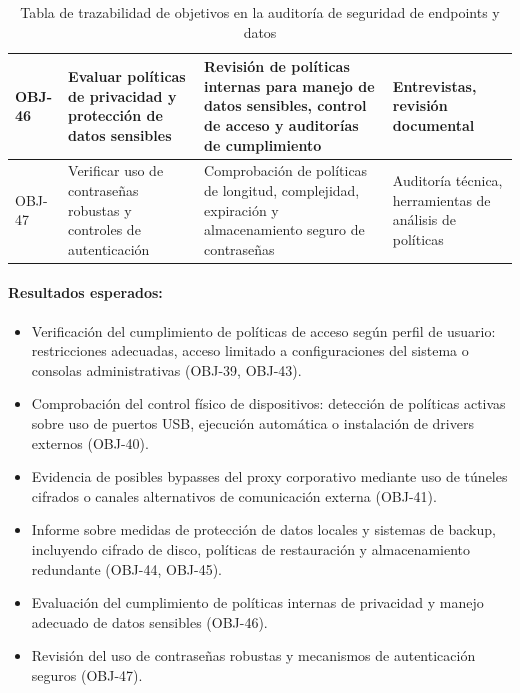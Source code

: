 \documentclass[a4paper, 10pt]{article}
\begin{document}
\begin{table}[H]
\begin{tabular}{|p{1.2cm}|p{4.2cm}|p{4.8cm}|p{3.8cm}|}
\hline
OBJ-46 & Evaluar políticas de privacidad y protección de datos sensibles & Revisión de políticas internas para manejo de datos sensibles, control de acceso y auditorías de cumplimiento & Entrevistas, revisión documental \\
\hline
OBJ-47 & Verificar uso de contraseñas robustas y controles de autenticación & Comprobación de políticas de longitud, complejidad, expiración y almacenamiento seguro de contraseñas & Auditoría técnica, herramientas de análisis de políticas \\
\hline
\end{tabular}
\caption{Tabla de trazabilidad de objetivos en la auditoría de seguridad de endpoints y datos}
\end{table}

\paragraph{Resultados esperados:}
\begin{itemize}
    \item Verificación del cumplimiento de políticas de acceso según perfil de usuario: restricciones adecuadas, acceso limitado a configuraciones del sistema o consolas administrativas (OBJ-39, OBJ-43).
    \item Comprobación del control físico de dispositivos: detección de políticas activas sobre uso de puertos USB, ejecución automática o instalación de drivers externos (OBJ-40).
    \item Evidencia de posibles bypasses del proxy corporativo mediante uso de túneles cifrados o canales alternativos de comunicación externa (OBJ-41).
    \item Informe sobre medidas de protección de datos locales y sistemas de backup, incluyendo cifrado de disco, políticas de restauración y almacenamiento redundante (OBJ-44, OBJ-45).
    \item Evaluación del cumplimiento de políticas internas de privacidad y manejo adecuado de datos sensibles (OBJ-46).
    \item Revisión del uso de contraseñas robustas y mecanismos de autenticación seguros (OBJ-47).
\end{itemize}
\end{document}
